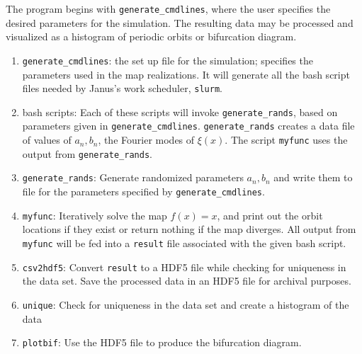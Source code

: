 The program begins with \texttt{generate\_cmdlines}, where the user
specifies the desired parameters for the simulation. The resulting
data may be processed and visualized as a histogram of periodic orbits
or bifurcation
diagram. 
\begin{enumerate}
\item \texttt{generate\_cmdlines}: the set up file for the simulation;
specifies the parameters used in the map realizations. It will
generate all the bash script files needed by Janus's work scheduler, \texttt{slurm}.
\item bash scripts: Each of these scripts will invoke
  \texttt{generate\_rands}, based on parameters given in
  \texttt{generate\_cmdlines}. \texttt{generate\_rands} creates a data
  file of values of $a_n,b_n$, the Fourier modes of $\xi(x)$. The
  script \texttt{myfunc} uses the output from
  \texttt{generate\_rands}.
\item \texttt{generate\_rands}: Generate randomized parameters $a_n,b_n$
  and write them to file for the parameters specified by \texttt{generate\_cmdlines}.
\item \texttt{myfunc}: Iteratively solve the map $f(x) = x$, and print out
  the orbit locations if they exist or return nothing if the map
  diverges. All output from \texttt{myfunc} will be fed into a
  \texttt{result} file associated with the given bash script. 
\item \texttt{csv2hdf5}: Convert \texttt{result} to a HDF5 file
  while checking for uniqueness in the data
  set. Save the processed data in an HDF5 file for archival
  purposes. 
\item \texttt{unique}: Check for uniqueness in the data set and create a histogram of the data
\item \texttt{plotbif}: Use the HDF5 file to produce the bifurcation diagram. 
\end{enumerate}
 
